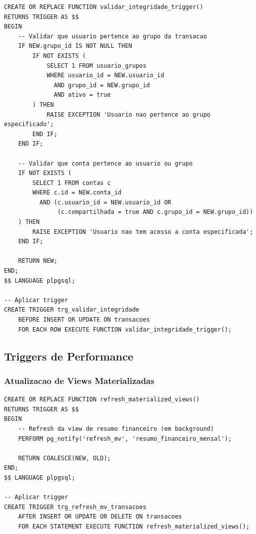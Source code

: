 \begin{lstlisting}[caption=Trigger para validacoes de integridade]
CREATE OR REPLACE FUNCTION validar_integridade_trigger()
RETURNS TRIGGER AS $$
BEGIN
    -- Validar que usuario pertence ao grupo da transacao
    IF NEW.grupo_id IS NOT NULL THEN
        IF NOT EXISTS (
            SELECT 1 FROM usuario_grupos 
            WHERE usuario_id = NEW.usuario_id 
              AND grupo_id = NEW.grupo_id 
              AND ativo = true
        ) THEN
            RAISE EXCEPTION 'Usuario nao pertence ao grupo especificado';
        END IF;
    END IF;
    
    -- Validar que conta pertence ao usuario ou grupo
    IF NOT EXISTS (
        SELECT 1 FROM contas c
        WHERE c.id = NEW.conta_id
          AND (c.usuario_id = NEW.usuario_id OR 
               (c.compartilhada = true AND c.grupo_id = NEW.grupo_id))
    ) THEN
        RAISE EXCEPTION 'Usuario nao tem acesso a conta especificada';
    END IF;
    
    RETURN NEW;
END;
$$ LANGUAGE plpgsql;

-- Aplicar trigger
CREATE TRIGGER trg_validar_integridade
    BEFORE INSERT OR UPDATE ON transacoes
    FOR EACH ROW EXECUTE FUNCTION validar_integridade_trigger();
\end{lstlisting}

\subsection{Triggers de Performance}

\subsubsection{Atualizacao de Views Materializadas}

\begin{lstlisting}[caption=Trigger para refresh de views materializadas]
CREATE OR REPLACE FUNCTION refresh_materialized_views()
RETURNS TRIGGER AS $$
BEGIN
    -- Refresh da view de resumo financeiro (em background)
    PERFORM pg_notify('refresh_mv', 'resumo_financeiro_mensal');
    
    RETURN COALESCE(NEW, OLD);
END;
$$ LANGUAGE plpgsql;

-- Aplicar trigger
CREATE TRIGGER trg_refresh_mv_transacoes
    AFTER INSERT OR UPDATE OR DELETE ON transacoes
    FOR EACH STATEMENT EXECUTE FUNCTION refresh_materialized_views();
\end{lstlisting}
